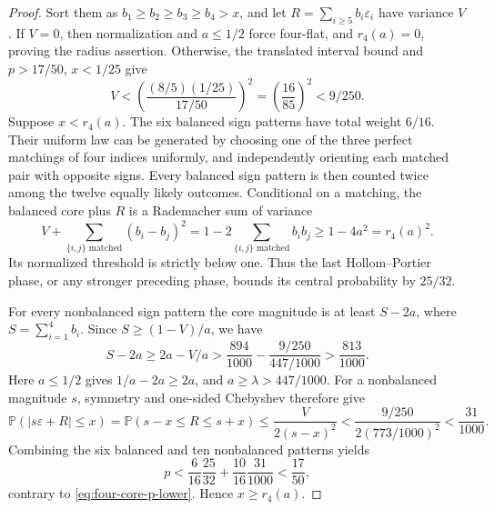 \documentclass[11pt]{article}
\theoremstyle{remark}\newtheorem{remark}[theorem]{Remark}
\newcommand{\Pp}{\mathbb P}
\begin{document}
\begin{proof}
Sort them as $b_1\ge b_2\ge b_3\ge b_4>x$, and let
$R=\sum_{i\ge5}b_i\varepsilon_i$ have variance $V$.
If $V=0$, then normalization and $a\le1/2$ force four-flat,
and $r_4(a)=0$, proving the radius assertion.
Otherwise, the translated interval bound and
$p>17/50$, $x<1/25$ give
\begin{equation}\label{eq:four-core-small-V}
 V<\left(\frac{(8/5)(1/25)}{17/50}\right)^2
 =\left(\frac{16}{85}\right)^2<9/250.
\end{equation}
Suppose $x<r_4(a)$. The six balanced sign patterns have total weight
$6/16$. Their uniform law can be generated by choosing one of the
three perfect matchings of four indices uniformly, and independently
orienting each matched pair with opposite signs. Every balanced sign
pattern is then counted twice among the twelve equally likely
outcomes. Conditional on a matching, the balanced core plus $R$ is
a Rademacher sum of variance
\[
 V+\sum_{\{i,j\}\text{ matched}}(b_i-b_j)^2
 =1-2\sum_{\{i,j\}\text{ matched}}b_i b_j
 \ge1-4a^2=r_4(a)^2.
\]
Its normalized threshold is strictly below one. Thus the last
Hollom--Portier phase, or any stronger preceding phase, bounds its
central probability by $25/32$.

For every nonbalanced sign pattern the core magnitude is at least
$S-2a$, where $S=\sum_{i=1}^4b_i$. Since
$S\ge(1-V)/a$, we have
\[
 S-2a\ge2a-V/a>
 \frac{894}{1000}-\frac{9/250}{447/1000}>
 \frac{813}{1000}.
\]
Here $a\le1/2$ gives $1/a-2a\ge2a$, and $a\ge\lambda>447/1000$.
For a nonbalanced magnitude $s$, symmetry and one-sided Chebyshev
therefore give
\[
 \Pp(|s\varepsilon+R|\le x)
 =\Pp(s-x\le R\le s+x)
 \le\frac{V}{2(s-x)^2}
 <\frac{9/250}{2(773/1000)^2}<\frac{31}{1000}.
\]
Combining the six balanced and ten nonbalanced patterns yields
\[
 p<\frac6{16}\frac{25}{32}+\frac{10}{16}\frac{31}{1000}
 <\frac{17}{50},
\]
contrary to \eqref{eq:four-core-p-lower}. Hence $x\ge r_4(a)$.
\end{proof}
\end{document}

